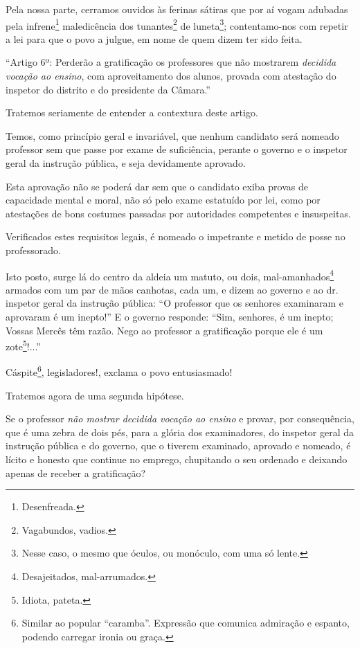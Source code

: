 Pela nossa parte, cerramos ouvidos às ferinas sátiras que por aí vogam
adubadas pela infrene\footnote{Desenfreada.} maledicência dos
tunantes\footnote{Vagabundos, vadios.} de luneta\footnote{Nesse
  caso, o mesmo que óculos, ou monóculo, com uma só lente.};
contentamo-nos com repetir a lei para que o povo a julgue, em nome de
quem dizem ter sido feita.

``Artigo 6º: Perderão a gratificação os professores que não mostrarem
\emph{decidida vocação ao ensino}, com aproveitamento dos alunos,
provada com atestação do inspetor do distrito e do presidente da
Câmara.''

Tratemos seriamente de entender a contextura deste artigo.

Temos, como princípio geral e invariável, que nenhum candidato será
nomeado professor sem que passe por exame de suficiência, perante o
governo e o inspetor geral da instrução pública, e seja devidamente
aprovado.

Esta aprovação não se poderá dar sem que o candidato exiba provas de
capacidade mental e moral, não só pelo exame estatuído por lei, como por
atestações de bons costumes passadas por autoridades competentes e
insuspeitas.

Verificados estes requisitos legais, é nomeado o impetrante e metido de
posse no professorado.

Isto posto, surge lá do centro da aldeia um matuto, ou dois,
mal-amanhados\footnote{Desajeitados, mal-arrumados.} armados com um
par de mãos canhotas, cada um, e dizem ao governo e ao dr. inspetor
geral da instrução pública: ``O professor que os senhores examinaram e
aprovaram é um inepto!'' E o governo responde: ``Sim, senhores, é um
inepto; Vossas Mercês têm razão. Nego ao professor a gratificação porque
ele é um zote\footnote{Idiota, pateta.}!...''

Cáspite\footnote{Similar ao popular ``caramba''. Expressão que comunica
  admiração e espanto, podendo carregar ironia ou graça.},
legisladores!, exclama o povo entusiasmado!

Tratemos agora de uma segunda hipótese.

Se o professor \emph{não mostrar decidida vocação ao ensino} e provar,
por consequência, que é uma zebra de dois pés, para a glória dos
examinadores, do inspetor geral da instrução pública e do governo, que o
tiverem examinado, aprovado e nomeado, é lícito e honesto que continue
no emprego, chupitando o seu ordenado e deixando apenas de receber a
gratificação?

